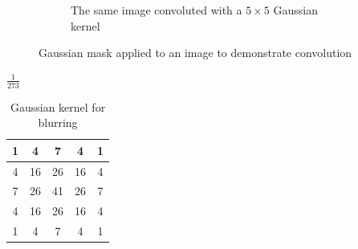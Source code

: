 \begin{figure}[!htb]
\begin{subfigure}[b]{0.49\linewidth}
  \caption{The same image convoluted with a \(5 \times 5\) Gaussian kernel}
  \label{fig:blur}
 \end{subfigure}
 \caption{Gaussian mask applied to an image to demonstrate convolution}
\end{figure}
\begin{table}[!htb]
\begin{center}
$\frac{1}{273}$
\begin{tabular}{|c|c|c|c|c|}\hline
1 & 4 & 7 & 4 & 1\\ \hline
4 &  16 &  26 &  16 &  4 \\ \hline
7 &  26 &  41 &  26 &  7\\ \hline
4 &  16 &  26 &  16 &  4\\ \hline
1 &  4 &  7 &  4 &  1 \\ \hline
\end{tabular}

\caption{Gaussian kernel for blurring}
\label{tbl:gauss}
\end{center}
\end{table}
